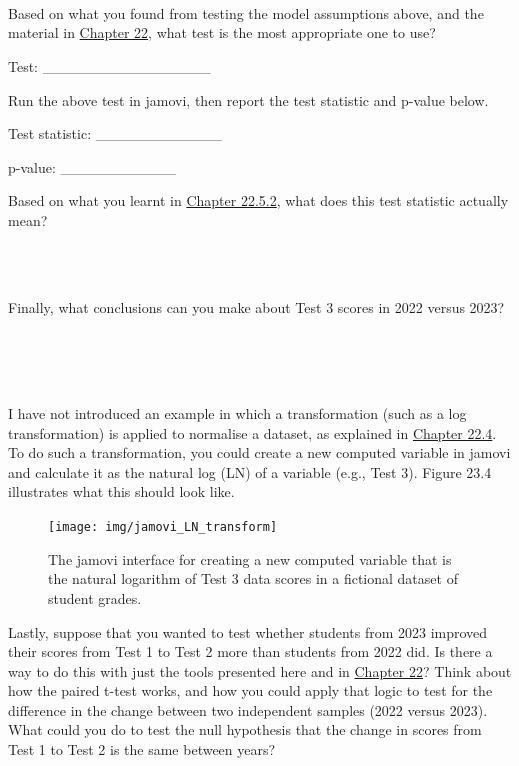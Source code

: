 \documentclass[
  openany]{krantz}
\begin{document}
\begin{verbatim}




\end{verbatim}

Based on what you found from testing the model assumptions above, and the material in \protect\hyperlink{Chapter_22}{Chapter 22}, what test is the most appropriate one to use?

Test: \_\_\_\_\_\_\_\_\_\_\_\_\_\_\_\_

Run the above test in jamovi, then report the test statistic and p-value below.

Test statistic: \_\_\_\_\_\_\_\_\_\_\_\_

p-value: \_\_\_\_\_\_\_\_\_\_\_

Based on what you learnt in \protect\hyperlink{mann-whitney-u-test}{Chapter 22.5.2}, what does this test statistic actually mean?

\begin{verbatim}



\end{verbatim}

Finally, what conclusions can you make about Test 3 scores in 2022 versus 2023?

\begin{verbatim}




\end{verbatim}

I have not introduced an example in which a transformation (such as a log transformation) is applied to normalise a dataset, as explained in \protect\hyperlink{assumptions-of-t-tests}{Chapter 22.4}.
To do such a transformation, you could create a new computed variable in jamovi and calculate it as the natural log (LN) of a variable (e.g., Test 3).
Figure 23.4 illustrates what this should look like.

\begin{figure}
\texttt{[image: img/jamovi\_LN\_transform]} \caption{The jamovi interface for creating a new computed variable that is the natural logarithm of Test 3 data scores in a fictional dataset of student grades.}\label{fig:unnamed-chunk-92}
\end{figure}

Lastly, suppose that you wanted to test whether students from 2023 improved their scores from Test 1 to Test 2 more than students from 2022 did.
Is there a way to do this with just the tools presented here and in \protect\hyperlink{Chapter_22}{Chapter 22}?
Think about how the paired t-test works, and how you could apply that logic to test for the difference in the change between two independent samples (2022 versus 2023).
What could you do to test the null hypothesis that the change in scores from Test 1 to Test 2 is the same between years?
\end{document}
